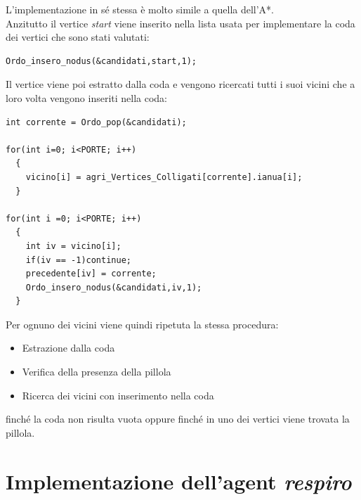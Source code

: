 \documentclass[8pt]{book}
\begin{document}
L'implementazione in sé stessa è molto simile a quella dell'A*.\\
Anzitutto il vertice \emph{start} viene inserito nella lista usata per implementare la coda dei vertici che sono stati valutati:

\begin{spacing}{0.9}
  \begin{small}
    \begin{tcolorbox}
\begin{verbatim}
Ordo_insero_nodus(&candidati,start,1);
\end{verbatim}
  \end{tcolorbox}
    \end{small}
      \end{spacing}
    
Il vertice viene poi estratto dalla coda e vengono ricercati tutti i suoi vicini che a loro volta vengono inseriti nella coda:

\begin{spacing}{0.9}
  \begin{small}
    \begin{tcolorbox}
\begin{verbatim}
int corrente = Ordo_pop(&candidati);

for(int i=0; i<PORTE; i++)
  {
    vicino[i] = agri_Vertices_Colligati[corrente].ianua[i];
  }

for(int i =0; i<PORTE; i++)
  {
    int iv = vicino[i];
    if(iv == -1)continue;
    precedente[iv] = corrente;
    Ordo_insero_nodus(&candidati,iv,1);
  }
\end{verbatim}
  \end{tcolorbox}
    \end{small}
      \end{spacing}
        
Per ognuno dei vicini viene quindi ripetuta la stessa procedura:

\begin{itemize}
\item
  Estrazione dalla coda
\item
  Verifica della presenza della pillola
\item
  Ricerca dei vicini con inserimento nella coda
\end{itemize}

finché la coda non risulta vuota oppure finché in uno dei vertici viene trovata la pillola.

\section{Implementazione dell'agent \emph{respiro}}
\end{document}
